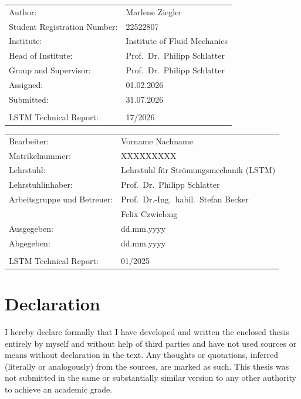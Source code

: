\documentclass[
 	11pt,                 				%
  	notitlepage,          				%
  	twoside, 			   				%
 	bibliography=totoc,
  	listof=totoc,
  	headsepline,         				%
  	footsepline,         				%
  cleardoublepage=empty,				%
  numbers=noenddot,
]{scrreprt}
\begin{document}
  	\thispagestyle{empty}	
	\cleardoublepage
	
	\ifenglish
	
	\begin{tabular}[H]{ll}
	  Author:& Marlene Ziegler \\
	  Student Registration Number: & 22522807 \\
	  Institute: & Institute of Fluid Mechanics\\
	  Head of Institute: & Prof.\ Dr.\  Philipp Schlatter\\ 
	  Group and Supervisor:& Prof.\ Dr.\ Philipp Schlatter \\		
	  Assigned: & 01.02.2026 \\
	  Submitted: & 31.07.2026 \\
	  \\
	  LSTM Technical Report: & 17/2026
	\end{tabular}	

	\else

	\begin{tabular}[H]{ll}
	Bearbeiter:& Vorname Nachname \\
	Matrikelnummer: & XXXXXXXXX \\
	Lehrstuhl: & Lehrstuhl für Strömungsmechanik (LSTM) \\
	Lehrstuhlinhaber: & Prof.\ Dr.\ Philipp Schlatter\\ 
	Arbeitsgruppe und Betreuer:& Prof.\ Dr.-Ing.\ habil.\ Stefan Becker \\
	& Felix Czwielong\\		
	Ausgegeben: & dd.mm.yyyy \\
	Abgegeben: & dd.mm.yyyy \\
	\\
	LSTM Technical Report: & 01/2025
	\end{tabular}
	
	\fi	

\thispagestyle{empty}
\cleardoublepage
{}
\setcounter{page}{1}
\ifenglish
\chapter*{Declaration}

I hereby declare formally that I have developed and written the enclosed thesis entirely by myself and without help of third parties and have not used sources or means without declaration in the text. Any thoughts or quotations, inferred (literally or analogously) from the sources, are marked as such. This thesis was not submitted in the same or substantially similar version to any other authority to achieve an academic grade.
\end{document}
